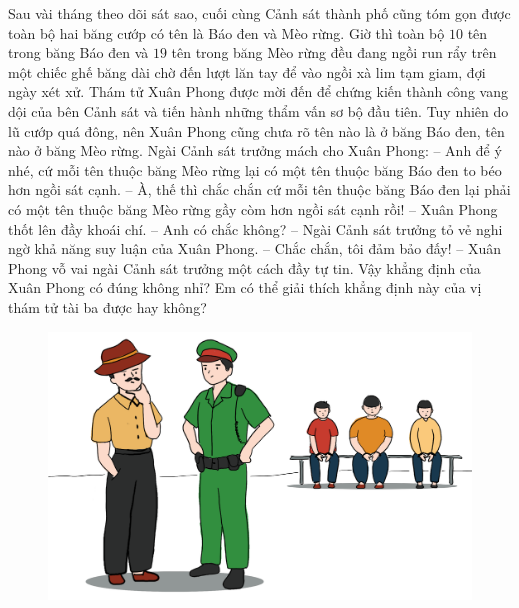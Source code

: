 \begin{multicols}{2}
	Sau vài tháng theo dõi sát sao, cuối cùng Cảnh sát thành phố cũng tóm gọn được toàn bộ hai băng cướp có tên là Báo đen và Mèo rừng. Giờ thì toàn bộ $10$ tên trong băng Báo đen và $19$ tên trong băng Mèo rừng đều đang ngồi run rẩy trên một chiếc ghế băng dài chờ đến lượt lăn tay để vào ngồi xà lim tạm giam, đợi ngày xét xử. Thám tử Xuân Phong được mời đến để chứng kiến thành công vang dội của bên Cảnh sát và tiến hành những thẩm vấn sơ bộ đầu tiên. Tuy nhiên do lũ cướp quá đông, nên Xuân Phong cũng chưa rõ tên nào là ở băng Báo đen, tên nào ở băng Mèo rừng. Ngài Cảnh sát trưởng mách cho Xuân Phong:
	\vskip 0.1cm
	--	Anh để ý nhé, cứ mỗi tên thuộc băng Mèo rừng lại có một tên thuộc băng Báo đen to béo hơn ngồi sát cạnh.
	\vskip 0.1cm
	--	À, thế thì chắc chắn cứ mỗi tên thuộc băng Báo đen lại phải có một tên thuộc băng Mèo rừng gầy còm hơn ngồi sát cạnh rồi! -- Xuân Phong thốt lên đầy khoái chí.
	\vskip 0.1cm
	--	Anh có chắc không? -- Ngài Cảnh sát trưởng tỏ vẻ nghi ngờ khả năng suy luận của Xuân Phong.
	\vskip 0.1cm
	--	Chắc chắn, tôi đảm bảo đấy! -- Xuân Phong vỗ vai ngài Cảnh sát trưởng một cách đầy tự tin.
	\vskip 0.1cm
	Vậy khẳng định của Xuân Phong có đúng không nhỉ? Em có thể giải thích khẳng định này của vị thám tử tài ba được hay không?
	\begin{figure}[H]
		\centering
		\vspace*{-5pt}
		\captionsetup{labelformat= empty, justification=centering}
		\includegraphics[width=1\linewidth]{xp}
		\vspace*{-10pt}
	\end{figure}
\end{multicols}
\newpage
